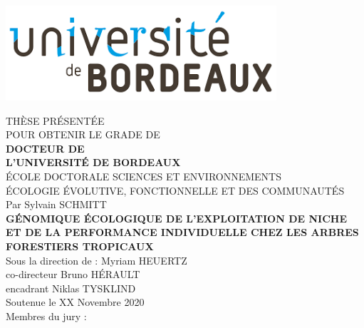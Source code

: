 \includegraphics[width=0.3\columnwidth]{images/UB.png}

\begin{center}
  \normalsize{THÈSE PRÉSENTÉE} \\
  \normalsize{POUR OBTENIR LE GRADE DE} \\
  \vspace*{\fill}
  \Large{\textbf{DOCTEUR DE}} \\
  \Large{\textbf{L'UNIVERSITÉ DE BORDEAUX}} \\
  \vspace*{\fill}
  \normalsize{ÉCOLE DOCTORALE SCIENCES ET ENVIRONNEMENTS} \\
  \normalsize{ÉCOLOGIE ÉVOLUTIVE, FONCTIONNELLE ET DES COMMUNAUTÉS} \\
  \vspace*{\fill}
  \normalsize{Par Sylvain SCHMITT} \\
  \vspace*{\fill}
  \Large{\textbf{GÉNOMIQUE ÉCOLOGIQUE DE L'EXPLOITATION DE NICHE ET DE LA PERFORMANCE INDIVIDUELLE CHEZ LES ARBRES FORESTIERS TROPICAUX}} \\
  \vspace*{\fill}
  \normalsize{Sous la direction de : Myriam HEUERTZ} \\
  \normalsize{co-directeur Bruno HÉRAULT} \\
  \normalsize{encadrant Niklas TYSKLIND} \\
  \vspace*{\fill}
  \normalsize{Soutenue le XX Novembre 2020} \\
  \vspace*{\fill}
  \normalsize{Membres du jury :} \\
  \vspace*{\fill}
  \begin{table}[b]
    \centering
  \end{table}
\end{center}
